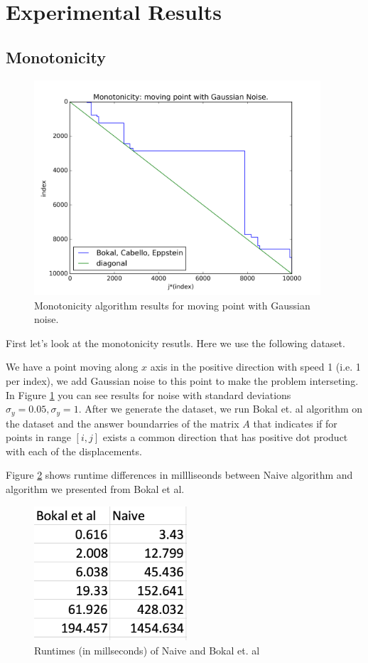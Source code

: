 \documentclass{article}
\begin{document}
\section{Experimental Results}

\subsection{Monotonicity}
\begin{figure}[!ht]
  \centering
  \includegraphics[height=8cm]{plots/monotonicity_moving_gaussian}
  \caption{Monotonicity algorithm results for moving point with Gaussian noise.}
  \label{fig:monotonicity_demo}
\end{figure}

First let's look at the monotonicity resutls. Here we use the following dataset.

We have a point moving along $x$ axis in the positive direction with speed 1 (i.e. 1 per index), we add Gaussian noise to this point to make the problem interseting. In Figure \ref{fig:monotonicity_demo} you can see results for noise with standard deviations $\sigma_y = 0.05, \sigma_y = 1$. After we generate the dataset, we run Bokal et. al algorithm on the dataset and the answer boundarries of the matrix $A$ that indicates if for points in range $[i, j]$ exists a common direction that has positive dot product with each of the displacements.

Figure \ref{fig:monotonicity_comparison} shows runtime differences in millliseonds between Naive algorithm and algorithm we presented from Bokal et al.
\begin{figure}[!ht]
  \centering
  \includegraphics[height=5cm]{plots/monotonicity_comparison}
  \caption{Runtimes (in millseconds) of Naive and Bokal et. al}
  \label{fig:monotonicity_comparison}
\end{figure}
\end{document}
